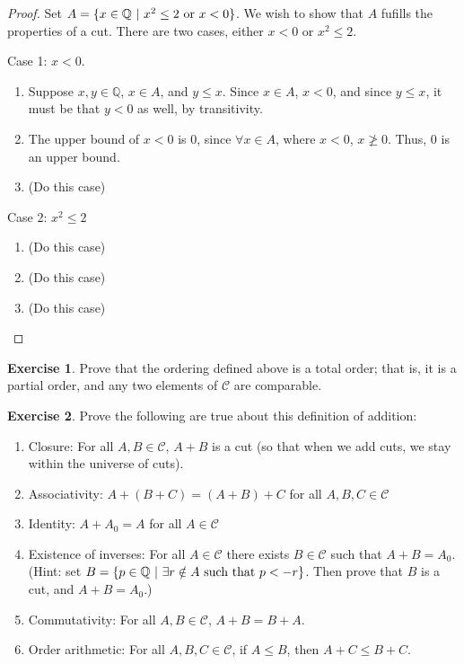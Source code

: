 \documentclass{article}
\theoremstyle{definition}
\newtheorem{exercise}{Exercise}
\newcommand{\Q}{\mathbb{Q}}
\begin{document}
\begin{proof}
 Set $A = \{x\in \Q\ | \ x^2\leq 2\hbox{ or } x<0\}$. We wish to show that $A$ fufills the properties of a cut. There are two cases, either $x < 0$ or $x^2\leq 2$. 

Case 1: $x < 0$. 
\begin{enumerate}
\item Suppose $x, y \in \Q$,  $x \in A$, and $y \leq x$.  Since $x \in A$, $x < 0$, and since $y \leq x$, it must be that $y < 0$ as well, by transitivity. 
\item The upper bound of $x < 0$ is 0, since $\forall x \in A$, where $x < 0$, $x \ngeq 0$. Thus, 0 is an upper bound.

\item (Do this case) 
\end{enumerate}

Case 2: $x^2\leq 2$
\begin{enumerate}
\item (Do this case) 
\item (Do this case) 
\item (Do this case) 
\end{enumerate}

\end{proof}

\begin{exercise}
Prove that the ordering defined above is a total order; that is, it is a partial order, and any two elements of $\mathcal{C}$ are comparable.
\end{exercise}

\begin{exercise}
Prove the following are true about this definition of addition:
\begin{enumerate}
\item Closure: For all $A, B\in \mathcal{C}$, $A+B$ is a cut (so that when we add cuts, we stay within the universe of cuts).
\item Associativity: $A+(B+C)=(A+B)+C$ for all $A, B, C\in \mathcal{C}$
\item Identity: $A+A_0=A$ for all $A\in \mathcal{C}$
\item Existence of inverses: For all $A\in \mathcal{C}$ there exists $B\in \mathcal{C}$ such that $A+B=A_0$. (Hint: set $B=\{p\in \Q\ | \ \exists r\notin A\hbox{ such that }p<-r\}$. Then prove that $B$ is a cut, and $A+B=A_0$.)
\item Commutativity: For all $A, B\in \mathcal{C}$, $A+B=B+A$.
\item Order arithmetic: For all $A, B, C\in \mathcal{C}$, if $A\leq B$, then $A+C\leq B+C$.
\end{enumerate}
\end{exercise}
\end{document}
